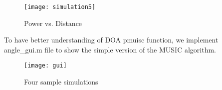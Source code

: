 \begin{figure}[ht]
	\centering
	\texttt{[image: simulation5]}
	\caption{Power vs. Distance}
	\end{figure}
	
\par
	To have better understanding of DOA pmuisc function, we implement angle_gui.m file to show the simple version of the MUSIC algorithm.\\
    \begin{figure}[ht]
	\centering
	\texttt{[image: gui]}
	\caption{Four sample simulations}
	\end{figure}

